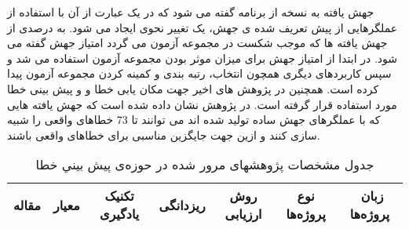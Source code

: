 جهش یافته به نسخه از برنامه گفته می شود که در یک عبارت از آن با استفاده از عملگرهایی از پیش تعریف شده ی جهش، یک تغییر نحوی ایجاد می شود. به درصدی از جهش یافته ها که موجب شکست در مجموعه آزمون می گردد امتیاز جهش گفته می شود. در ابتدا از امتیاز جهش برای میزان موثر بودن مجموعه آزمون استفاده می شد و سپس کاربردهای دیگری همچون انتخاب، رتبه بندی و کمینه کردن مجموعه آزمون پیدا کرده است. همچنین در پژوهش های اخیر جهت مکان یابی خطا و  و پیش بینی خطا مورد استفاده قرار گرفته است. در پژوهش \cite{just2014mutants} نشان داده شده است که جهش یافته هایی  که با عملگرهای جهش ساده تولید شده اند می توانند تا 73 \lr{\%} خطاهای واقعی را شبیه سازی کنند و ازین جهت جایگزین مناسبی برای خطاهای واقعی باشند. 


\begin{table}[H] 
	\centering \caption{جدول مشخصات پژوهشهای مرور شده در حوزه‌ی پيش بيني خطا}
	\label{tab:survey}
	
	\begin{tabular}{|c|c|c|c|c|c|c|}
		\hline
		\hline
		مقاله & معیار   & تکنیک یادگیری &  ریزدانگی &روش ارزیابی & نوع پروژه‌ها&‌ زبان پروژه‌ها   \\
		\hline
		\hline
		
		
	
\end{tabular}
\end{table}









